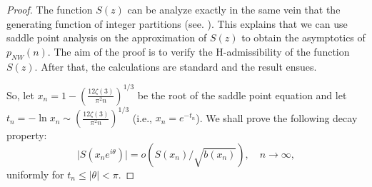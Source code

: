 \documentclass{article}
\begin{document}
\begin{proof}
The function $S(z)$ can be analyze exactly in the same vein that the generating function of integer partitions (see. \cite[p574-578]{Flajolet2009}). This explains that we can use saddle point analysis on the approximation of $S(z)$ to obtain the asymptotics of $p_{NW}(n).$ The aim of the proof is to verify the H-admissibility of the function $S(z)$. After that, the calculations are standard and the result ensues.

So, let $x_n=1-\left(\frac{12\zeta(3)}{\pi^2 n}\right)^{1/3}$ be the
root of the saddle point equation and let
$t_n=-\ln{x_n}\sim\left(\frac{12\zeta(3)}{\pi^2 n}\right)^{1/3}$
(i.e., $x_n=e^{-t_n}$). We shall prove the following decay property:
\begin{equation}\label{decay}
\mid S(x_n e^{i\theta})\mid=o(S(x_n)/\sqrt{b(x_n)}), \quad
n\to\infty,
\end{equation}
uniformly for $t_n\le\mid\theta\mid<\pi$.


\end{proof}
\end{document}
